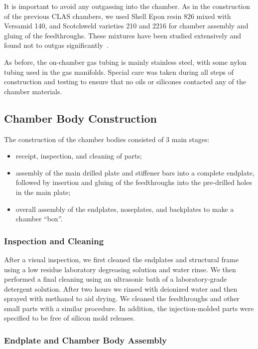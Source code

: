 It is important to avoid any outgassing into the chamber.  As in the construction
of the previous CLAS chambers, we used Shell Epon resin 826 mixed with Versamid 140, and 
Scotchweld varieties 210 and 2216 for chamber assembly and gluing of the feedthroughs.  These mixtures have been 
studied extensively and found not to outgas significantly~\cite{nasa}.

As before, the on-chamber gas tubing is mainly stainless steel, with some
nylon tubing used in the gas manifolds. Special care was taken during
all steps of construction and testing to ensure that no oils or
silicones contacted any of the chamber materials.

\subsection{Chamber Body Construction}

The construction of the chamber bodies consisted of 3 main stages:
\begin{itemize}
\item receipt, inspection, and cleaning of parts;
\item assembly of the main drilled plate and stiffener bars into a complete endplate,
followed by insertion and gluing of the feedthroughs into the pre-drilled holes 
in the main plate;
\item overall assembly of the endplates, noseplates, and backplates to make
a chamber ``box''.
\end{itemize}

\subsubsection{Inspection and Cleaning}

After a visual inspection, we first cleaned the endplates and structural 
frame using a low residue laboratory degreasing solution and water rinse.
We then performed a final cleaning using an ultrasonic bath of a laboratory-grade detergent solution.  
After two hours we rinsed with deionized water and then sprayed 
with methanol to aid drying.
We cleaned the feedthroughs and other small parts with a similar procedure.
In addition, the injection-molded parts were specified to be free of silicon 
mold releases.
 
\subsubsection{Endplate and Chamber Body Assembly}

